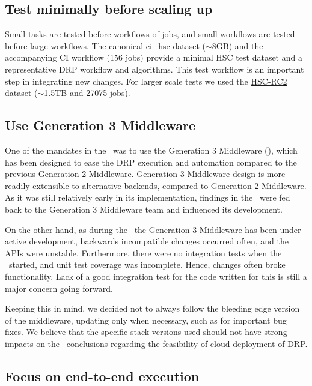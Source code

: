 \subsection{Test minimally before scaling up}

Small tasks are tested before workflows of jobs, and small workflows are tested before large workflows.
The canonical \href{https://github.com/lsst/ci\_hsc}{ci\_hsc} dataset ($\sim$8GB) and the accompanying CI workflow (156 jobs) provide a minimal HSC test dataset and a representative DRP workflow and algorithms.
This test workflow is an important step in integrating new changes.
For larger scale tests we used the \href{https://jira.lsstcorp.org/browse/DM-11345}{HSC-RC2 dataset} ($\sim$1.5TB and 27075 jobs).

\subsection{Use Generation 3 Middleware}

One of the mandates in the \poc~was to use the Generation 3 Middleware (), which has been designed to ease the DRP execution and automation compared to the previous Generation 2 Middleware.
Generation 3 Middleware design is more readily extensible to alternative backends, compared to Generation 2 Middleware.
As it was still relatively early in its implementation, findings in the \poc~were fed back to the Generation 3 Middleware team and influenced its development.

On the other hand, as during the \poc~the Generation 3 Middleware has been under active development, backwards incompatible changes occurred often, and the APIs were unstable.
Furthermore, there were no integration tests when the \poc~started, and unit test coverage was incomplete.
Hence, changes often broke functionality.
Lack of a good integration test for the code written for this \poc is still a major concern going forward.

Keeping this in mind, we decided not to always follow the bleeding edge version of the middleware, updating only when necessary, such as for important bug fixes.
We believe that the specific stack versions used should not have strong impacts on the \poc~conclusions regarding the feasibility of cloud deployment of DRP.

\subsection{Focus on end-to-end execution}

